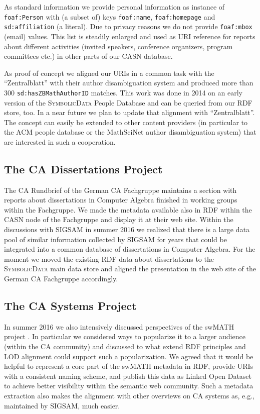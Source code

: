 \documentclass{mathincs}
\newcommand{\SD}{\textsc{Symbo\-lic\-Data}}
\begin{document}
As standard information we provide personal information as instance of
\texttt{foaf:Person} with (a subset of) keys \texttt{foaf:name},
\texttt{foaf:homepage} and \texttt{sd:affiliation} (a literal). Due to privacy
reasons we do not provide \texttt{foaf:mbox} (email) values.  This list is
steadily enlarged and used as URI reference for reports about different
activities (invited speakers, conference organizers, program committees etc.)
in other parts of our CASN database.

As proof of concept we aligned our URIs in a common task with the
``Zentralblatt'' with their author disambiguation system and produced more
than 300 \texttt{sd:hasZBMathAuthorID} matches. This work was done in 2014 on
an early version of the {\SD} People Database and can be queried from our RDF
store, too.  In a near future we plan to update that alignment with
``Zentralblatt''.  The concept can easily be extended to other content
providers (in particular to the ACM people database or the MathSciNet author
disambiguation system) that are interested in such a cooperation.

\subsection{The CA Dissertations Project}

The CA Rundbrief of the German CA Fachgruppe maintains a section with reports
about dissertations in Computer Algebra finished in working groups within the
Fachgruppe.  We made the metadata available also in RDF within the CASN node
of the Fachgruppe and display it at their web site.  Within the discussions
with SIGSAM in summer 2016 we realized that there is a large data pool of
similar information collected by SIGSAM for years that could be integrated
into a common database of dissertations in Computer Algebra. For the moment we
moved the existing RDF data about dissertations to the {\SD} main data store
and aligned the presentation in the web site of the German CA Fachgruppe
accordingly.

\subsection{The CA Systems Project}

In summer 2016 we also intensively discussed perspectives of the swMATH
project \cite{swmath}. In particular we considered ways to popularize it to a
larger audience (within the CA community) and discussed to what extend RDF
principles and LOD alignment could support such a popularization.  We agreed
that it would be helpful to represent a core part of the swMATH metadata in
RDF, provide URIs with a consistent naming scheme, and publish this data as
Linked Open Dataset to achieve better visibility within the semantic web
community.  Such a metadata extraction also makes the alignment with other
overviews on CA systems as, e.g., maintained by SIGSAM, much easier.
\end{document}
